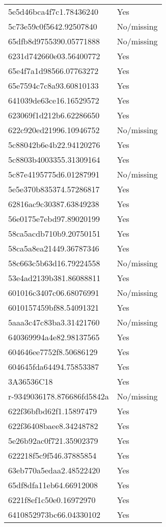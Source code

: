 \begin{tabular}{ll}
5e5d46bca4f7c1.78436240 & Yes \\
5c73e59c0f5642.92507840 & No/missing \\
65dfb8d9755390.05771888 & No/missing \\
6231d742660e03.56400772 & Yes \\
65e4f7a1d98566.07763272 & Yes \\
65e7594c7c8a93.60810133 & Yes \\
641039de63ce16.16529572 & Yes \\
623069f1d212b6.62286650 & Yes \\
622c920ed21996.10946752 & No/missing \\
5c88042b6e4b22.94120276 & Yes \\
5c8803b4003355.31309164 & Yes \\
5c87e4195775d6.01287991 & No/missing \\
5e5e370b835374.57286817 & Yes \\
62816ac9c30387.63849238 & Yes \\
56e0175e7ebd97.89020199 & Yes \\
58ca5acdb710b9.20750151 & Yes \\
58ca5a8ea21449.36787346 & Yes \\
58c663c5b63d16.79224558 & No/missing \\
53e4ad2139b381.86088811 & Yes \\
601016c3407c06.68076991 & No/missing \\
6010157459bf88.54091321 & Yes \\
5aaa3c47c83ba3.31421760 & No/missing \\
640369994a4e82.98137565 & Yes \\
604646ee7752f8.50686129 & Yes \\
604645fda64494.75853387 & Yes \\
3A36536C18 & Yes \\
r-9349036178.876686fd5842a & No/missing \\
622f36bfbd62f1.15897479 & Yes \\
622f36408baee8.34248782 & Yes \\
5e26b92ac0f721.35902379 & Yes \\
622218f5c9f546.37885854 & Yes \\
63eb770a5edaa2.48522420 & Yes \\
65df8dfa11eb64.66912008 & Yes \\
6221f8ef1c50e0.16972970 & Yes \\
6410852973bc66.04330102 & Yes \\

\end{tabular}
